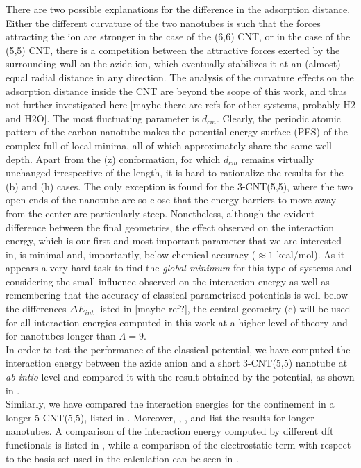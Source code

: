 \documentclass[utf8]{article}
\begin{document}
There are two possible explanations for the difference in the adsorption distance. Either the different curvature of the two nanotubes is such that the forces attracting the ion are stronger in the case of the (6,6) CNT, or in the case of the (5,5) CNT, there is a competition between the attractive forces exerted by the surrounding wall on the azide ion, which eventually stabilizes it at an (almost) equal radial distance in any direction.
The analysis of the curvature effects on the adsorption distance inside the CNT are beyond the scope of this work, and thus not further investigated here [maybe there are refs for other systems, probably H2 and H2O].
The most fluctuating parameter is $d_{cm}$. Clearly, the periodic atomic pattern of the carbon nanotube makes the potential energy surface (PES) of the complex full of local minima, all of which approximately share the same well depth. Apart from the (z) conformation, for which $d_{cm}$ remains virtually unchanged irrespective of the length, it is hard to rationalize the results for the (b) and (h) cases.
The only exception is found for the 3-CNT(5,5), where the two open ends of the nanotube are so close that the energy barriers to move away from the center are particularly steep.
Nonetheless, although the evident difference between the final geometries, the effect observed on the interaction energy, which is our first and most important parameter that we are interested in, is minimal and, importantly, below chemical accuracy ($\approx 1$ kcal/mol).
As it appears a very hard task to find the \emph{global minimum} for this type of systems and considering the small influence observed on the interaction energy as well as remembering that the accuracy of classical parametrized potentials is well below the differences $\Delta E_{int}$ listed in  [maybe ref?], the central geometry (c) will be used for all interaction energies computed in this work at a higher level of theory and for nanotubes longer than $\Lambda = 9$.\\


In order to test the performance of the classical potential, we have computed the interaction energy between the azide anion and a short 3-CNT(5,5) nanotube at \textit{ab-intio} level and compared it with the result obtained by the potential, as shown in .\\
Similarly, we have compared the interaction energies for the confinement in a longer 5-CNT(5,5), listed in .
Moreover, , ,  and  list the results for longer nanotubes.
A comparison of the interaction energy computed by different dft functionals is listed in , while a comparison of the electrostatic term with respect to the basis set used in the calculation can be seen in .
\end{document}
